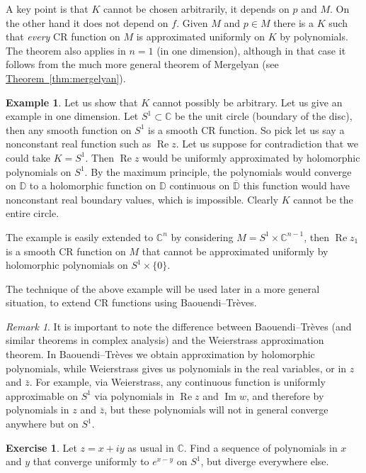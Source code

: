 \documentclass[12pt,openany]{book}
\renewcommand{\Re}{\operatorname{Re}}
\renewcommand{\Im}{\operatorname{Im}}
\newcommand{\C}{{\mathbb{C}}}
\newcommand{\D}{{\mathbb{D}}}
\theoremstyle{plain}
\theoremstyle{remark}
\newtheorem{remark}[thm]{Remark}
\theoremstyle{definition}
\newenvironment{exbox}{%
    \def\FrameCommand{\vrule width 1pt \relax\hspace {10pt}}%
    \MakeFramed {\advance \hsize -\width \FrameRestore }%
}{%
    \endMakeFramed
}
\theoremstyle{exercise}
\newtheorem{exercise}{Exercise}[section]
\theoremstyle{example}
\newtheorem{example}[thm]{Example}
\newcommand{\thmref}[1]{\hyperref[#1]{Theorem~\ref*{#1}}}
\begin{document}
A key point is that $K$ cannot be chosen arbitrarily, it depends on $p$ and $M$.
On the other hand it does not depend on $f$.  Given $M$ and $p \in M$
there is a $K$ such that \emph{every} CR function on $M$ is approximated
uniformly on $K$ by polynomials.  The theorem also applies in $n=1$ (in one
dimension), although in that case it follows from the much more general
theorem of Mergelyan
(see \thmref{thm:mergelyan}).

\begin{example}
Let us show that $K$ cannot possibly be arbitrary.  Let us give an example
in one dimension.  Let $S^1 \subset \C$ be the unit circle (boundary of the disc),
then any smooth function on $S^1$ is a smooth CR function.  So pick let us
say a nonconstant real function such as $\Re z$.  Let us suppose for
contradiction that we could take $K = S^1$.  Then $\Re z$ would be uniformly
approximated by holomorphic polynomials on $S^1$.  By the maximum principle, the
polynomials would converge on $\D$ to a holomorphic function on $\D$
continuous on $\overline{\D}$ this function would have nonconstant real boundary values,
which is impossible.  Clearly $K$ cannot be the entire circle.

The example is easily extended to $\C^n$
by considering 
$M = S^1 \times \C^{n-1}$, then $\Re z_1$ is a smooth CR function on $M$ that cannot be
approximated uniformly by holomorphic polynomials on $S^1 \times \{ 0 \}$.
\end{example}

The technique of the above example will be used later in a more general
situation, to extend CR functions using Baouendi--Tr{\`e}ves.

\begin{remark}
It is important to note the difference
between Baouendi--Tr{\`e}ves (and similar theorems
in complex analysis)
and the Weierstrass approximation theorem.  In Baouendi--Tr{\`e}ves we obtain
approximation by holomorphic polynomials, while Weierstrass gives us
polynomials in the real variables, or in $z$ and $\bar{z}$.  For example,
via Weierstrass, any continuous function is uniformly approximable on $S^1$ via polynomials
in $\Re z$ and $\Im w$, and therefore by polynomials in $z$ and $\bar{z}$,
but these polynomials will not in general converge anywhere but on $S^1$.
\end{remark}

\begin{exbox}
\begin{exercise}
Let $z=x+iy$ as usual in $\C$.
Find a sequence of polynomials in $x$ and $y$ that converge uniformly to $e^{x-y}$ on $S^1$,
but diverge everywhere else.
\end{exercise}
\end{exbox}
\end{document}
